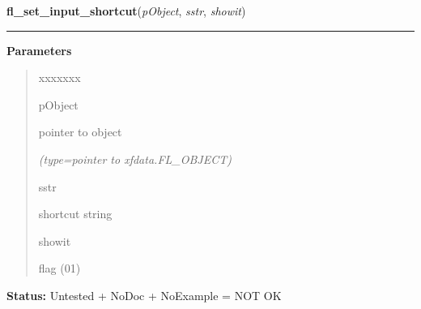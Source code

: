 \hspace{.8\funcindent}\begin{boxedminipage}{\funcwidth}

    \raggedright \textbf{fl\_set\_input\_shortcut}(\textit{pObject}, \textit{sstr}, \textit{showit})

    \vspace{-1.5ex}

    \rule{\textwidth}{0.5\fboxrule}
\setlength{\parskip}{2ex}
\setlength{\parskip}{1ex}
      \textbf{Parameters}
      \vspace{-1ex}

      \begin{quote}
        \begin{Ventry}{xxxxxxx}

          \item[pObject]

          pointer to object

            {\it (type=pointer to xfdata.FL\_OBJECT)}

          \item[sstr]

          shortcut string

          \item[showit]

          flag (0{\textbar}1)

        \end{Ventry}

      \end{quote}

\textbf{Status:} Untested + NoDoc + NoExample = NOT OK



    \end{boxedminipage}

    \label{xformslib:library:fl_set_input_editkeymap}

    \vspace{0.5ex}

